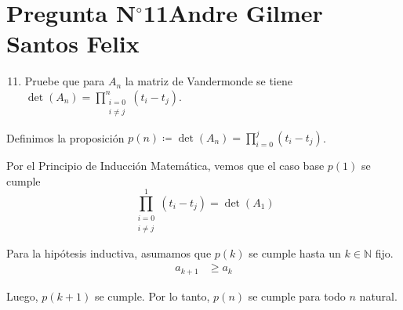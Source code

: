 \section{Pregunta N$^{\circ}$11\qquad Andre Gilmer Santos Felix}



\begin{frame}
	\begin{enumerate}\setcounter{enumi}{10}
		\item

		      Pruebe que para $A_{n}$ la matriz de Vandermonde se
		      tiene
		      \begin{math}
			      \det\left(A_{n}\right)=
			      \prod\limits_{\substack{i=0\\i\neq j}}^{n}
			      \left(t_{i}-t_{j}\right)
		      \end{math}.
	\end{enumerate}

	\begin{solution}

		Definimos la proposición
		\begin{math}
			p\left(n\right)\coloneqq
			\det\left(A_{n}\right)=
			\prod\limits_{i=0}^{j}
			\left(t_{i}-t_{j}\right)
		\end{math}.

		Por el \alert{Principio de Inducción Matemática}, vemos que
		el caso base $p\left(1\right)$ se cumple
		\begin{equation*}
			\prod\limits_{\substack{i=0\\i\neq j}}^{1}
			\left(t_{i}-t_{j}\right)
			=\det\left(A_{1}\right)
		\end{equation*}

		Para la hipótesis inductiva, asumamos que $p\left(k\right)$ se
		cumple hasta un $k\in\mathbb{N}$ fijo.
		\begin{align*}
			a_{k+1} & \geq a_{k}
		\end{align*}

		Luego, $p\left(k+1\right)$ se cumple.
		Por lo tanto, $p\left(n\right)$ se cumple para todo $n$ natural.
	\end{solution}
\end{frame}
